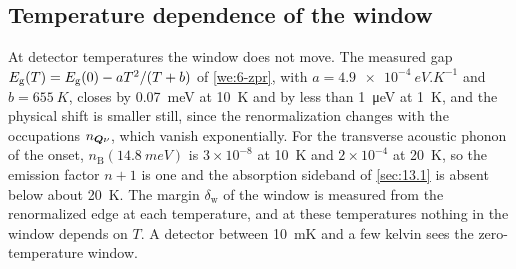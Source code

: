 \subsection{Temperature dependence of the window}

At detector temperatures the window does not move. The measured gap $E_{\mathrm{g}}(T) = E_{\mathrm{g}}(0) - aT^2/(T + b)$ of \cref{we:6-zpr}, with $a = \SI{4.9e-4}{eV.K^{-1}}$ and $b = \SI{655}{K}$, closes by \SI{0.07}{meV} at \SI{10}{K} and by less than \SI{1}{\micro eV} at \SI{1}{K}, and the physical shift is smaller still, since the renormalization changes with the occupations $n_{\bm{Q}\nu}$, which vanish exponentially. For the transverse acoustic phonon of the onset, $n_{\mathrm{B}}(\SI{14.8}{meV})$ is $3\times10^{-8}$ at \SI{10}{K} and $2\times10^{-4}$ at \SI{20}{K}, so the emission factor $n + 1$ is one and the absorption sideband of \cref{sec:13.1} is absent below about \SI{20}{K}. The margin $\delta_{\mathrm{w}}$ of the window is measured from the renormalized edge at each temperature, and at these temperatures nothing in the window depends on $T$. A detector between \SI{10}{mK} and a few kelvin sees the zero-temperature window.


